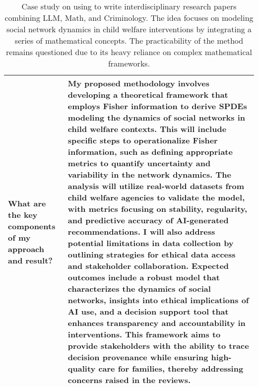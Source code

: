 \begin{table*}[htbp]
\begin{tabular}{p{3.5cm}p{12cm}}
\\ \midrule
What are the key components of my approach and result? & 
 My proposed methodology involves developing a theoretical framework that employs Fisher information to derive SPDEs modeling the dynamics of social networks in child welfare contexts. This will include specific steps to operationalize Fisher information, such as defining appropriate metrics to quantify uncertainty and variability in the network dynamics. The analysis will utilize real-world datasets from child welfare agencies to validate the model, with metrics focusing on stability, regularity, and predictive accuracy of AI-generated recommendations. I will also address potential limitations in data collection by outlining strategies for ethical data access and stakeholder collaboration. Expected outcomes include a robust model that characterizes the dynamics of social networks, insights into ethical implications of AI use, and a decision support tool that enhances transparency and accountability in interventions. This framework aims to provide stakeholders with the ability to trace decision provenance while ensuring high-quality care for families, thereby addressing concerns raised in the reviews.\\ 
 \bottomrule[1.1pt]
\end{tabular}
\caption{Case study on using \envname to write interdisciplinary research papers combining LLM, Math, and Criminology. The idea focuses on modeling social network dynamics in child welfare interventions by integrating a series of mathematical concepts. The practicability of the method remains questioned due to its heavy reliance on complex mathematical frameworks.}
\label{tab:LLM+Math+Criminology}
\end{table*}


